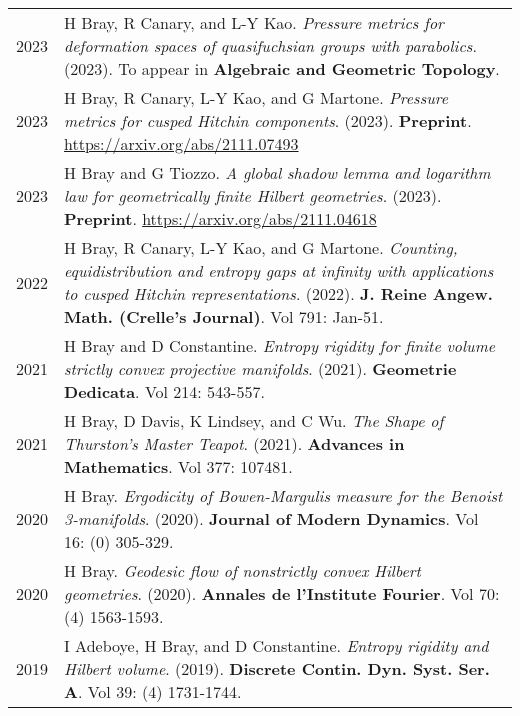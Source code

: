 
    \medskip


    \medskip
    
    \begin{center}
    {
    \renewcommand{\arraystretch}{1.5}
    \begin{longtable}{p{}  p{}}
    
2023 & 
        H Bray, R Canary, and L-Y Kao. \textit{Pressure metrics for deformation spaces of quasifuchsian groups with parabolics}. (2023). 
        To appear in \textbf{Algebraic and Geometric Topology}.\\ 

2023 & 
        H Bray, R Canary, L-Y Kao, and G Martone. \textit{Pressure metrics for cusped Hitchin components}. (2023). 
         \textbf{Preprint}. \url{https://arxiv.org/abs/2111.07493}\\ 

2023 & 
        H Bray and G Tiozzo. \textit{A global shadow lemma and logarithm law for geometrically finite Hilbert geometries}. (2023). 
         \textbf{Preprint}. \url{https://arxiv.org/abs/2111.04618}\\ 

2022 & 
        H Bray, R Canary, L-Y Kao, and G Martone. \textit{Counting, equidistribution and entropy gaps at infinity with applications to cusped Hitchin representations}. (2022). 
        \textbf{J. Reine Angew. Math. (Crelle's Journal)}. Vol 791: Jan-51.\\ 

2021 & 
        H Bray and D Constantine. \textit{Entropy rigidity for finite volume strictly convex projective manifolds}. (2021). 
        \textbf{Geometrie Dedicata}. Vol 214: 543-557.\\ 

2021 & 
        H Bray, D Davis, K Lindsey, and C Wu. \textit{The Shape of Thurston's Master Teapot}. (2021). 
        \textbf{Advances in Mathematics}. Vol 377: 107481.\\ 

2020 & 
        H Bray. \textit{Ergodicity of Bowen-Margulis measure for the Benoist 3-manifolds}. (2020). 
        \textbf{Journal of Modern Dynamics}. Vol 16: (0) 305-329.\\ 

2020 & 
        H Bray. \textit{Geodesic flow of nonstrictly convex Hilbert geometries}. (2020). 
        \textbf{Annales de l'Institute Fourier}. Vol 70: (4) 1563-1593.\\ 

2019 & 
        I Adeboye, H Bray, and D Constantine. \textit{Entropy rigidity and Hilbert volume}. (2019). 
        \textbf{Discrete Contin. Dyn. Syst. Ser. A}. Vol 39: (4) 1731-1744.
    \end{longtable}
    } 
    \end{center}

    \vspace{-1em}
    